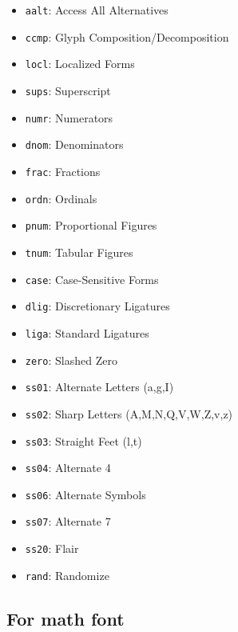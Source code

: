 \documentclass[a4paper]{scrartcl}
\newcommand*{\opt}[1]{\texttt{#1}}
\begin{document}
\begin{itemize}
  \item \opt{aalt}: Access All Alternatives
  \item \opt{ccmp}: Glyph Composition/Decomposition
  \item \opt{locl}: Localized Forms
  \item \opt{sups}: Superscript
  \item \opt{numr}: Numerators
  \item \opt{dnom}: Denominators
  \item \opt{frac}: Fractions
  \item \opt{ordn}: Ordinals
  \item \opt{pnum}: Proportional Figures
  \item \opt{tnum}: Tabular Figures
  \item \opt{case}: Case-Sensitive Forms
  \item \opt{dlig}: Discretionary Ligatures
  \item \opt{liga}: Standard Ligatures
  \item \opt{zero}: Slashed Zero
  \item \opt{ss01}: Alternate Letters (a,g,I)
  \item \opt{ss02}: Sharp Letters  (A,M,N,Q,V,W,Z,v,z)
  \item \opt{ss03}: Straight Feet (l,t)
  \item \opt{ss04}: Alternate 4
  \item \opt{ss06}: Alternate Symbols
  \item \opt{ss07}: Alternate 7
  \item \opt{ss20}: Flair
  \item \opt{rand}: Randomize
\end{itemize}

%
%
%
%
%
%
%

\pagebreak

\subsection{For math font}
\end{document}
